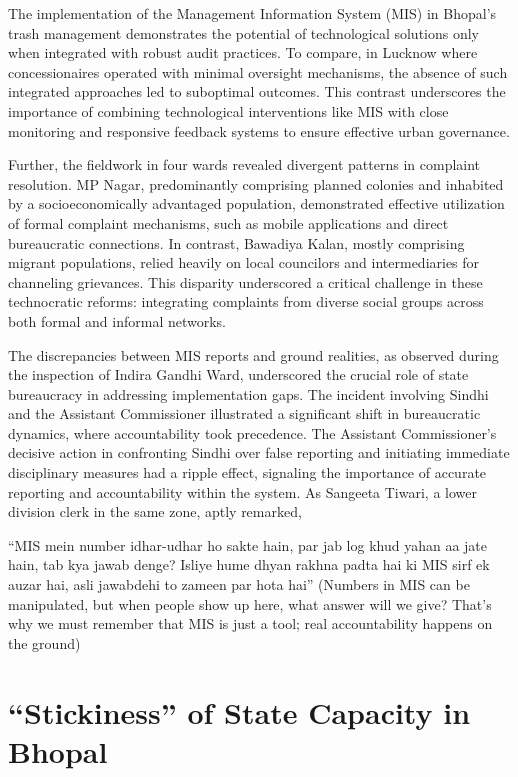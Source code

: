 The implementation of the Management Information System (MIS) in Bhopal's trash management demonstrates the potential of technological solutions only when integrated with robust audit practices. To compare, in Lucknow where concessionaires operated with minimal oversight mechanisms, the absence of such integrated approaches led to suboptimal outcomes. This contrast underscores the importance of combining technological interventions like MIS with close monitoring and responsive feedback systems to ensure effective urban governance.

Further, the fieldwork in four wards revealed divergent patterns in complaint resolution. MP Nagar, predominantly comprising planned colonies and inhabited by a socioeconomically advantaged population, demonstrated effective utilization of formal complaint mechanisms, such as mobile applications and direct bureaucratic connections. In contrast, Bawadiya Kalan, mostly comprising migrant populations, relied heavily on local councilors and intermediaries for channeling grievances. This disparity underscored a critical challenge in these technocratic reforms: integrating complaints from diverse social groups across both formal and informal networks.

The discrepancies between MIS reports and ground realities, as observed during the inspection of Indira Gandhi Ward, underscored the crucial role of state bureaucracy in addressing implementation gaps. The incident involving Sindhi and the Assistant Commissioner illustrated a significant shift in bureaucratic dynamics, where accountability took precedence. The Assistant Commissioner's decisive action in confronting Sindhi over false reporting and initiating immediate disciplinary measures had a ripple effect, signaling the importance of accurate reporting and accountability within the system. As Sangeeta Tiwari, a lower division clerk in the same zone, aptly remarked,

``MIS mein number idhar-udhar ho sakte hain, par jab log khud yahan aa jate hain, tab kya jawab denge? Isliye hume dhyan rakhna padta hai ki MIS sirf ek auzar hai, asli jawabdehi to zameen par hota hai'' (Numbers in MIS can be manipulated, but when people show up here, what answer will we give? That's why we must remember that MIS is just a tool; real accountability happens on the ground)

\section{``Stickiness'' of State Capacity in Bhopal}

